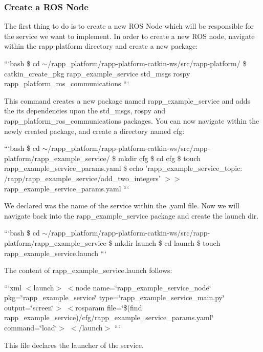 \subsubsection*{Create a R\-O\-S Node}

The first thing to do is to create a new R\-O\-S Node which will be responsible for the service we want to implement. In order to create a new R\-O\-S node, navigate within the rapp-\/platform directory and create a new package\-:

```bash \$ cd $\sim$/rapp\-\_\-platform/rapp-\/platform-\/catkin-\/ws/src/rapp-\/platform/ \$ catkin\-\_\-create\-\_\-pkg rapp\-\_\-example\-\_\-service std\-\_\-msgs rospy rapp\-\_\-platform\-\_\-ros\-\_\-communications ```

This command creates a new package named rapp\-\_\-example\-\_\-service and adds the its dependencies upon the std\-\_\-msgs, rospy and rapp\-\_\-platform\-\_\-ros\-\_\-communications packages. You can now navigate within the newly created package, and create a directory named cfg\-:

```bash \$ cd $\sim$/rapp\-\_\-platform/rapp-\/platform-\/catkin-\/ws/src/rapp-\/platform/rapp\-\_\-example\-\_\-service/ \$ mkdir cfg \$ cd cfg \$ touch rapp\-\_\-example\-\_\-service\-\_\-params.\-yaml \$ echo 'rapp\-\_\-example\-\_\-service\-\_\-topic\-: /rapp/rapp\-\_\-example\-\_\-service/add\-\_\-two\-\_\-integers' $>$$>$ rapp\-\_\-example\-\_\-service\-\_\-params.\-yaml ```

We declared was the name of the service within the .yaml file. Now we will navigate back into the rapp\-\_\-example\-\_\-service package and create the launch dir.

```bash \$ cd $\sim$/rapp\-\_\-platform/rapp-\/platform-\/catkin-\/ws/src/rapp-\/platform/rapp\-\_\-example\-\_\-service \$ mkdir launch \$ cd launch \$ touch rapp\-\_\-example\-\_\-service.\-launch ```

The content of {\ttfamily rapp\-\_\-example\-\_\-service.\-launch} follows\-:

```xml $<$launch$>$ $<$node name=\char`\"{}rapp\-\_\-example\-\_\-service\-\_\-node\char`\"{} pkg=\char`\"{}rapp\-\_\-example\-\_\-service\char`\"{} type=\char`\"{}rapp\-\_\-example\-\_\-service\-\_\-main.\-py\char`\"{} output=\char`\"{}screen\char`\"{}$>$ $<$rosparam file=\char`\"{}\$(find rapp\-\_\-example\-\_\-service)/cfg/rapp\-\_\-example\-\_\-service\-\_\-params.\-yaml\char`\"{} command=\char`\"{}load\char`\"{}$>$ $<$/launch$>$ ```

This file declares the launcher of the service.

